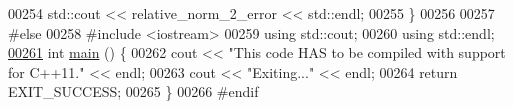 \begin{DoxyCode}
00254   std::cout << relative\_norm\_2\_error << std::endl;
00255 \}
00256 
00257 \textcolor{preprocessor}{#else}
00258 \textcolor{preprocessor}{#include <iostream>}
00259 \textcolor{keyword}{using} std::cout;
00260 \textcolor{keyword}{using} std::endl;
\hypertarget{poisson__1d_8cc_source_l00261}{}\hyperlink{poisson__1d_8cc_ae66f6b31b5ad750f1fe042a706a4e3d4}{00261} \textcolor{keywordtype}{int} \hyperlink{poisson__1d_8cc_ae66f6b31b5ad750f1fe042a706a4e3d4}{main} () \{
00262   cout << \textcolor{stringliteral}{"This code HAS to be compiled with support for C++11."} << endl;
00263   cout << \textcolor{stringliteral}{"Exiting..."} << endl;
00264   \textcolor{keywordflow}{return} EXIT\_SUCCESS;
00265 \}
00266 \textcolor{preprocessor}{#endif}
\end{DoxyCode}
